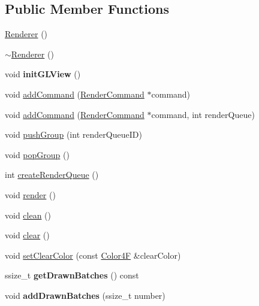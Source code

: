 \subsection*{Public Member Functions}
\begin{DoxyCompactItemize}
\item 
\hyperlink{classRenderer_a7ebf46f54dab9905f79b80f7fddb76a6}{Renderer} ()
\item 
\hyperlink{classRenderer_afeee408862d5bd6255a6882d47e6d5cd}{$\sim$\+Renderer} ()
\item 
\mbox{\label{classRenderer_abf81af4b7517ee396148032c004589ca}} 
void {\bfseries init\+G\+L\+View} ()
\item 
void \hyperlink{classRenderer_a139f9b3af45019ab6ec84743d83eff0c}{add\+Command} (\hyperlink{classRenderCommand}{Render\+Command} $\ast$command)
\item 
void \hyperlink{classRenderer_a4f73aa27436dc3844a5bc1181cad5521}{add\+Command} (\hyperlink{classRenderCommand}{Render\+Command} $\ast$command, int render\+Queue)
\item 
void \hyperlink{classRenderer_aa2da1f3530bf2033be91a1d1489bbb57}{push\+Group} (int render\+Queue\+ID)
\item 
void \hyperlink{classRenderer_a76f0edf8fec541dd32f4c188bd5469de}{pop\+Group} ()
\item 
int \hyperlink{classRenderer_a8a199907ebd8389f15595cfbd37042df}{create\+Render\+Queue} ()
\item 
void \hyperlink{classRenderer_af7e5f8f68742f198e315fb4683a605a4}{render} ()
\item 
void \hyperlink{classRenderer_a609184e9e7ed6bf88448458ffc229981}{clean} ()
\item 
void \hyperlink{classRenderer_ac46720b3fc0dbb2fc37674766490a8c4}{clear} ()
\item 
void \hyperlink{classRenderer_ac098692bd1bad4e15176c9a95c6e1183}{set\+Clear\+Color} (const \hyperlink{structColor4F}{Color4F} \&clear\+Color)
\item 
\mbox{\label{classRenderer_a14abb8eac3312b713482bfc9c29c02e8}} 
ssize\+\_\+t {\bfseries get\+Drawn\+Batches} () const
\item 
\mbox{\label{classRenderer_a3c833a68b2980d4a553dca5e86a8984c}} 
void {\bfseries add\+Drawn\+Batches} (ssize\+\_\+t number)
\item 
\mbox{\label{classRenderer_acb6393c935dc8634a5144ae05571577c}} 

\end{DoxyCompactItemize}
